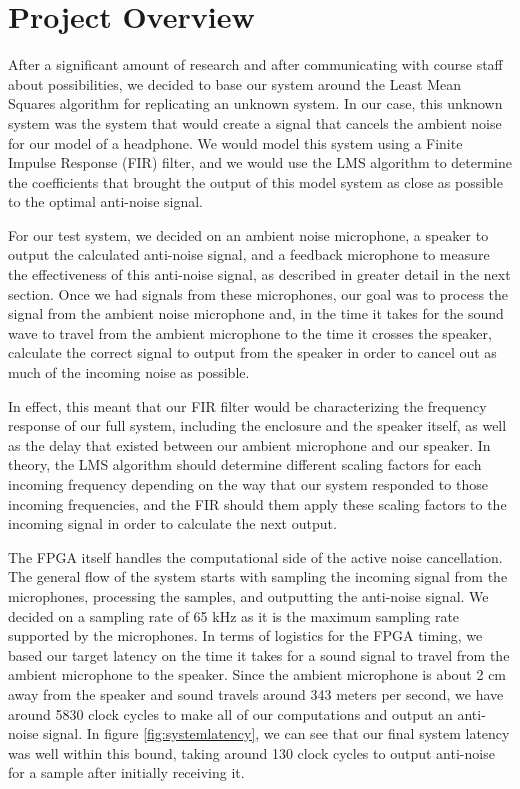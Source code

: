 \documentclass{fpgairpods}
\begin{document}
\section{Project Overview} %
After a significant amount of research and after communicating with course staff about possibilities, we decided to base our system around the Least Mean Squares algorithm for replicating an unknown system. In our case, this unknown system was the system that would create a signal that cancels the ambient noise for our model of a headphone. We would model this system using a Finite Impulse Response (FIR) filter, and we would use the LMS algorithm to determine the coefficients that brought the output of this model system as close as possible to the optimal anti-noise signal.

For our test system, we decided on an ambient noise microphone, a speaker to output the calculated anti-noise signal, and a feedback microphone to measure the effectiveness of this anti-noise signal, as described in greater detail in the next section. Once we had signals from these microphones, our goal was to process the signal from the ambient noise microphone and, in the time it takes for the sound wave to travel from the ambient microphone to the time it crosses the speaker, calculate the correct signal to output from the speaker in order to cancel out as much of the incoming noise as possible.

In effect, this meant that our FIR filter would be characterizing the frequency response of our full system, including the enclosure and the speaker itself, as well as the delay that existed between our ambient microphone and our speaker. In theory, the LMS algorithm should determine different scaling factors for each incoming frequency depending on the way that our system responded to those incoming frequencies, and the FIR should them apply these scaling factors to the incoming signal in order to calculate the next output.

The FPGA itself handles the computational side of the active noise cancellation. The general flow of the system starts with sampling the incoming signal from the microphones, processing the samples, and outputting the anti-noise signal. We decided on a sampling rate of 65 kHz as it is the maximum sampling rate supported by the microphones. In terms of logistics for the FPGA timing, we based our target latency on the time it takes for a sound signal to travel from the ambient microphone to the speaker. Since the ambient microphone is about 2 cm away from the speaker and sound travels around 343 meters per second, we have around 5830 clock cycles to make all of our computations and output an anti-noise signal. In figure \ref{fig:systemlatency}, we can see that our final system latency was well within this bound, taking around 130 clock cycles to output anti-noise for a sample after initially receiving it.
\end{document}
